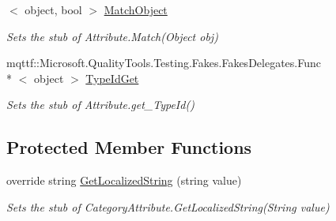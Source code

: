 \begin{DoxyCompactItemize}
$<$ object, bool $>$ \hyperlink{class_system_1_1_component_model_1_1_fakes_1_1_stub_category_attribute_a51a96723abdd9aca597c31a258bfce55}{Match\-Object}
\begin{DoxyCompactList}\small\item\em Sets the stub of Attribute.\-Match(\-Object obj)\end{DoxyCompactList}\item 
mqttf\-::\-Microsoft.\-Quality\-Tools.\-Testing.\-Fakes.\-Fakes\-Delegates.\-Func\\*
$<$ object $>$ \hyperlink{class_system_1_1_component_model_1_1_fakes_1_1_stub_category_attribute_a0800d2d9ae5f5ac4173a5f53a08db44a}{Type\-Id\-Get}
\begin{DoxyCompactList}\small\item\em Sets the stub of Attribute.\-get\-\_\-\-Type\-Id()\end{DoxyCompactList}\end{DoxyCompactItemize}
\subsection*{Protected Member Functions}
\begin{DoxyCompactItemize}
\item 
override string \hyperlink{class_system_1_1_component_model_1_1_fakes_1_1_stub_category_attribute_adb2cbe544338a4b3687633291cb7877f}{Get\-Localized\-String} (string value)
\begin{DoxyCompactList}\small\item\em Sets the stub of Category\-Attribute.\-Get\-Localized\-String(\-String value)\end{DoxyCompactList}\end{DoxyCompactItemize}
